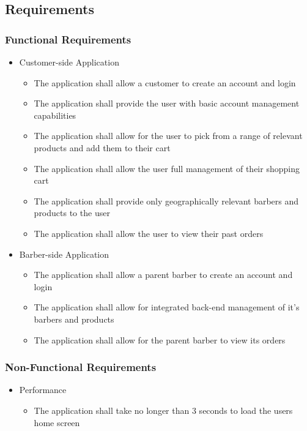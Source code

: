\documentclass[12pt]{article}
\begin{document}
	\subsection{Requirements}
	\subsubsection{Functional Requirements}
	
	\begin{itemize}
		\item Customer-side Application
		\begin{itemize}
			\item The application shall allow a customer to create an account and login
			\item The application shall provide the user with basic account management capabilities
			\item The application shall allow for the user to pick from a range of relevant products and add them to their cart
			\item The application shall allow the user full management of their shopping cart
			\item The application shall provide only geographically relevant barbers and products to the user
			\item The application shall allow the user to view their past orders
			
		\end{itemize}
	\end{itemize}

	\begin{itemize}
		\item Barber-side Application
		\begin{itemize}
			\item The application shall allow a parent barber to create an account and login
			\item The application shall allow for integrated back-end management of it's barbers and products
			\item The application shall allow for the parent barber to view its orders
		\end{itemize}
	\end{itemize}
	
	\subsubsection{Non-Functional Requirements}
	
	\begin{itemize}
		\item Performance
		\begin{itemize}
			\item The application shall take no longer than 3 seconds to load the users home screen
		\end{itemize}
	\end{itemize}
\end{document}
